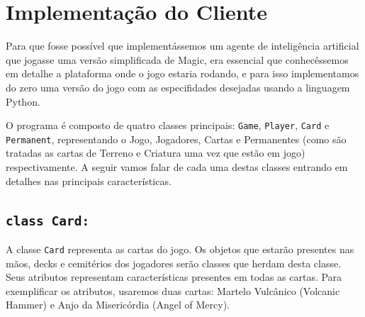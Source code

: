 \chapter{Implementação do Cliente}
Para que fosse possível que implementássemos um agente de inteligência artificial que
jogasse uma versão simplificada de Magic, era essencial que conhecêssemos em detalhe a
plataforma onde o jogo estaria rodando, e para isso implementamos do zero uma versão do
jogo com as especifidades desejadas usando a linguagem Python.

O programa é composto de quatro classes principais: \texttt{Game}, \texttt{Player}, \texttt{Card}
e \texttt{Permanent}, representando o Jogo, Jogadores, Cartas e Permanentes (como são tratadas as
cartas de Terreno e Criatura uma vez que estão em jogo) respectivamente. A seguir vamos falar de
cada uma destas classes entrando em detalhes nas principais características.

\section{\texttt{class Card:}}
A classe \texttt{Card} representa as cartas do jogo. Os objetos que estarão presentes nas mãos,
decks e cemitérios dos jogadores serão classes que herdam desta classe. Seus atributos representam
características presentes em todas as cartas. Para exemplificar os atributos, usaremos duas cartas:
Martelo Vulcânico (Volcanic Hammer) e Anjo da Misericórdia (Angel of Mercy).

